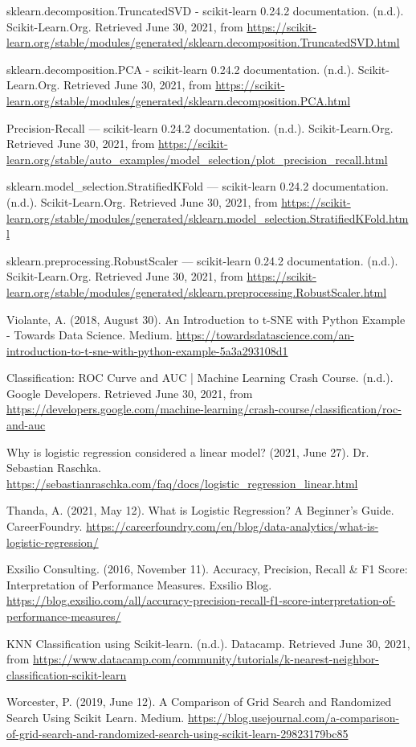 \documentclass[conference]{IEEEtran}
\begin{document}
\begin{thebibliography}{00}
 sklearn.decomposition.TruncatedSVD - scikit-learn 0.24.2 documentation. (n.d.). Scikit-Learn.Org. Retrieved June 30, 2021, from \url{https://scikit-learn.org/stable/modules/generated/sklearn.decomposition.TruncatedSVD.html}

 sklearn.decomposition.PCA - scikit-learn 0.24.2 documentation. (n.d.). Scikit-Learn.Org. Retrieved June 30, 2021, from \url{https://scikit-learn.org/stable/modules/generated/sklearn.decomposition.PCA.html}

 Precision-Recall — scikit-learn 0.24.2 documentation. (n.d.). Scikit-Learn.Org. Retrieved June 30, 2021, from \url{https://scikit-learn.org/stable/auto_examples/model_selection/plot_precision_recall.html}

 sklearn.model\_selection.StratifiedKFold — scikit-learn 0.24.2 documentation. (n.d.). Scikit-Learn.Org. Retrieved June 30, 2021, from \url{https://scikit-learn.org/stable/modules/generated/sklearn.model\_selection.StratifiedKFold.html}

 sklearn.preprocessing.RobustScaler — scikit-learn 0.24.2 documentation. (n.d.). Scikit-Learn.Org. Retrieved June 30, 2021, from \url{https://scikit-learn.org/stable/modules/generated/sklearn.preprocessing.RobustScaler.html}

 Violante, A. (2018, August 30). An Introduction to t-SNE with Python Example - Towards Data Science. Medium. \url{https://towardsdatascience.com/an-introduction-to-t-sne-with-python-example-5a3a293108d1}

 Classification: ROC Curve and AUC | Machine Learning Crash Course. (n.d.). Google Developers. Retrieved June 30, 2021, from \url{https://developers.google.com/machine-learning/crash-course/classification/roc-and-auc}

 Why is logistic regression considered a linear model? (2021, June 27). Dr. Sebastian Raschka. \url{https://sebastianraschka.com/faq/docs/logistic\_regression\_linear.html}

 Thanda, A. (2021, May 12). What is Logistic Regression? A Beginner’s Guide. CareerFoundry. \url{https://careerfoundry.com/en/blog/data-analytics/what-is-logistic-regression/}

 Exsilio Consulting. (2016, November 11). Accuracy, Precision, Recall \& F1 Score: Interpretation of Performance Measures. Exsilio Blog. \url{https://blog.exsilio.com/all/accuracy-precision-recall-f1-score-interpretation-of-performance-measures/}

 KNN Classification using Scikit-learn. (n.d.). Datacamp. Retrieved June 30, 2021, from \url{https://www.datacamp.com/community/tutorials/k-nearest-neighbor-classification-scikit-learn}

 Worcester, P. (2019, June 12). A Comparison of Grid Search and Randomized Search Using Scikit Learn. Medium. \url{https://blog.usejournal.com/a-comparison-of-grid-search-and-randomized-search-using-scikit-learn-29823179bc85}

\end{thebibliography}
\end{document}
